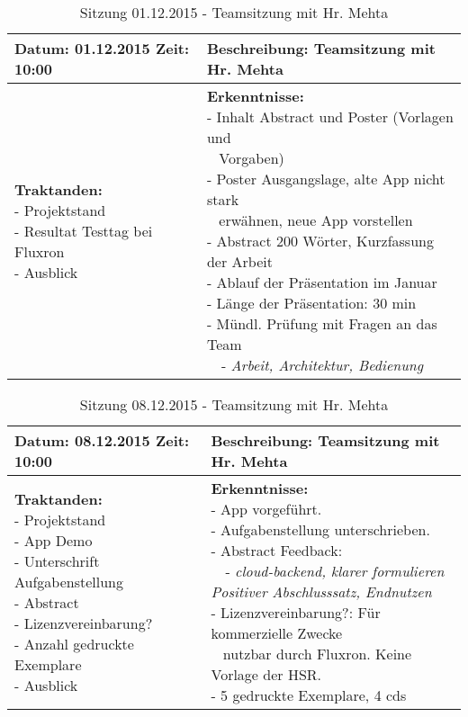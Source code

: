 \begin{table}[H]
\begin{tabularx}{\textwidth}{| l | X |}
\hline
\textbf{Datum:} 01.12.2015
\textbf{Zeit:} 10:00
&
\textbf{Beschreibung:} Teamsitzung mit Hr. Mehta \\ \hline
\specialcell[t]{
\textbf{Traktanden:}\\
- Projektstand\\
- Resultat Testtag bei Fluxron\\
- Ausblick\\
}
& 
\specialcell[t]{
\textbf{Erkenntnisse:}\\
- Inhalt Abstract und Poster (Vorlagen und\\~ Vorgaben)\\
- Poster Ausgangslage, alte App nicht stark\\~ erwähnen, neue App vorstellen\\
- Abstract 200 Wörter, Kurzfassung der Arbeit\\
- Ablauf der Präsentation im Januar\\
- Länge der Präsentation: 30 min\\
- Mündl. Prüfung mit Fragen an das Team\\
~~- \textit{Arbeit, Architektur, Bedienung}\\
}
\\ \hline
\end{tabularx}
\caption{Sitzung 01.12.2015 - Teamsitzung mit Hr. Mehta}
\end{table}



\begin{table}[H]
\begin{tabularx}{\textwidth}{| l | X |}
\hline
\textbf{Datum:} 08.12.2015
\textbf{Zeit:} 10:00
&
\textbf{Beschreibung:} Teamsitzung mit Hr. Mehta \\ \hline
\specialcell[t]{
\textbf{Traktanden:}\\
- Projektstand\\
- App Demo\\
- Unterschrift Aufgabenstellung\\
- Abstract\\
- Lizenzvereinbarung?\\
- Anzahl gedruckte Exemplare\\
- Ausblick\\
}
& 
\specialcell[t]{
\textbf{Erkenntnisse:}\\
- App vorgeführt.\\
- Aufgabenstellung unterschrieben.\\
- Abstract Feedback:\\
~~- \textit{cloud-backend, klarer formulieren}\\
\textit{Positiver Abschlusssatz, Endnutzen}\\
- Lizenzvereinbarung?: Für kommerzielle Zwecke\\~ nutzbar durch Fluxron. Keine Vorlage der HSR.\\
- 5 gedruckte Exemplare, 4 cds\\
}
\\ \hline
\end{tabularx}
\caption{Sitzung 08.12.2015 - Teamsitzung mit Hr. Mehta}
\end{table}
\pagebreak